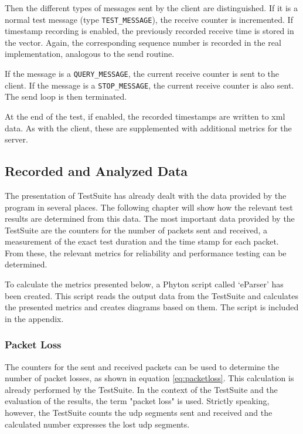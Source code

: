 Then the different types of messages sent by the client are distinguished. If it is a normal test message (type \texttt{TEST\_MESSAGE}), the receive counter is incremented. If timestamp recording is enabled, the previously recorded receive time is stored in the vector. Again, the corresponding sequence number is recorded in the real implementation, analogous to the send routine.

If the message is a \texttt{QUERY\_MESSAGE}, the current receive counter is sent to the client. If the message is a \texttt{STOP\_MESSAGE}, the current receive counter is also sent. The send loop is then terminated.

At the end of the test, if enabled, the recorded timestamps are written to \ac{xml} data. As with the client, these are supplemented with additional metrics for the server.


\subsection{Recorded and Analyzed Data} \label{chap:evaluationTS} 

The presentation of TestSuite has already dealt with the data provided by the program in several places. The following chapter will show how the relevant test results are determined from this data.
The most important data provided by the TestSuite are the counters for the number of packets sent and received, a measurement of the exact test duration and the time stamp for each packet. From these, the relevant metrics for reliability and performance testing can be determined.

To calculate the metrics presented below, a Phyton script called `eParser' has been created. This script reads the output data from the TestSuite and calculates the presented metrics and creates diagrams based on them. The script is included in the appendix.

\subsubsection{Packet Loss}
The counters for the sent and received packets can be used to determine the number of packet losses, as shown in equation \ref{eq:packetloss}. This calculation is already performed by the TestSuite.
In the context of the TestSuite and the evaluation of the results, the term "packet loss" is used. Strictly speaking, however, the TestSuite counts the \ac{udp} segments sent and received and the calculated number expresses the lost \ac{udp} segments.

